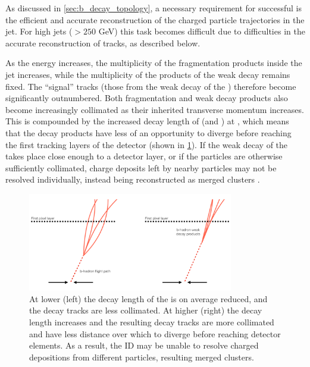 As discussed in \cref{sec:b_decay_topology}, a necessary requirement for successful \btagging is the efficient and accurate reconstruction of the charged particle trajectories in the jet.
For high \pT jets (\pT $> 250$ GeV) this task becomes difficult due to difficulties in the accurate reconstruction of tracks, as described below.

As the \bjet energy increases, the multiplicity of the fragmentation products inside the jet increases, while the multiplicity of the products of the weak decay remains fixed.
The ``signal'' tracks (those from the weak decay of the \bhadron) therefore become significantly outnumbered.
Both fragmentation and \bhadron weak decay products also become increasingly collimated as their inherited transverse momentum increases.
This is compounded by the increased decay length of \bhadrons (and \chadrons) at \highpt, which means that the decay products have less of an opportunity to diverge before reaching the first tracking layers of the detector (shown in \cref{fig:high_pt_b_decay}).
If the weak decay of the \bhadron takes place close enough to a detector layer, or if the particles are otherwise sufficiently collimated, charge deposits left by nearby particles may not be resolved individually, instead being reconstructed as merged clusters \cite{PERF-2015-08}.

\begin{figure}[!htbp]
  \centering
  \includegraphics[width=0.8\textwidth]{chapters/3.tracking/figs/high_pt_b_decay.pdf}
  \caption{
    At lower \pt (left) the decay length of the \bhadron is on average reduced, and the decay tracks are less collimated.
    At higher \pt (right) the \bhadron decay length increases and the resulting decay tracks are more collimated and have less distance over which to diverge before reaching detector elements.
    As a result, the ID may be unable to resolve charged depositions from different particles, resulting merged clusters.
  }
  \label{fig:high_pt_b_decay}
\end{figure}

